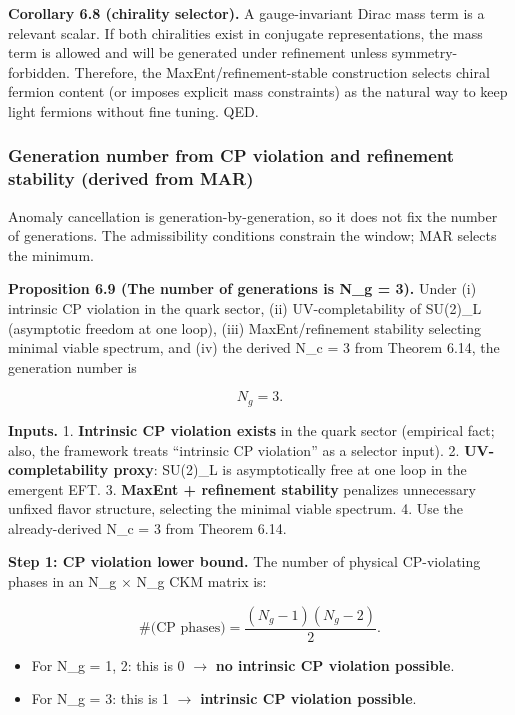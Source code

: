 \documentclass[11pt,a4paper]{article}
\theoremstyle{remark}
\providecommand{\tightlist}{%
  \setlength{\itemsep}{0pt}\setlength{\parskip}{0pt}}
\begin{document}
\textbf{Corollary 6.8 (chirality selector).} A gauge-invariant Dirac mass term is
a relevant scalar. If both chiralities exist in conjugate representations,
the mass term is allowed and will be generated under refinement unless
symmetry-forbidden. Therefore, the MaxEnt/refinement-stable construction
selects chiral fermion content (or imposes explicit mass constraints) as the
natural way to keep light fermions without fine tuning. QED.

\subsubsection{Generation number from CP violation and refinement stability (derived from MAR)}\label{generation-number-from-cp-violation-and-refinement-stability-derived-from-mar}

Anomaly cancellation is generation-by-generation, so it does not fix the
number of generations. The admissibility conditions constrain the window;
MAR selects the minimum.

\textbf{Proposition 6.9 (The number of generations is N\_g = 3).} Under (i)
intrinsic CP violation in the quark sector, (ii) UV-completability of
SU(2)\_L (asymptotic freedom at one loop), (iii) MaxEnt/refinement
stability selecting minimal viable spectrum, and (iv) the derived N\_c = 3
from Theorem 6.14, the generation number is

\[
N_g = 3.
\]

\textbf{Inputs.}
1. \textbf{Intrinsic CP violation exists} in the quark sector (empirical fact;
also, the framework treats ``intrinsic CP violation'' as a selector input).
2. \textbf{UV-completability proxy}: SU(2)\_L is asymptotically free at one
loop in the emergent EFT.
3. \textbf{MaxEnt + refinement stability} penalizes unnecessary unfixed flavor
structure, selecting the minimal viable spectrum.
4. Use the already-derived N\_c = 3 from Theorem 6.14.

\textbf{Step 1: CP violation lower bound.} The number of physical CP-violating
phases in an N\_g \ensuremath{\times} N\_g CKM matrix is:

\[
\#\text{(CP phases)} = \frac{(N_g - 1)(N_g - 2)}{2}.
\]

\begin{itemize}
\tightlist
\item
  For N\_g = 1, 2: this is 0 \ensuremath{\to} \textbf{no intrinsic CP violation possible}.
\item
  For N\_g = 3: this is 1 \ensuremath{\to} \textbf{intrinsic CP violation possible}.
\end{itemize}
\end{document}
